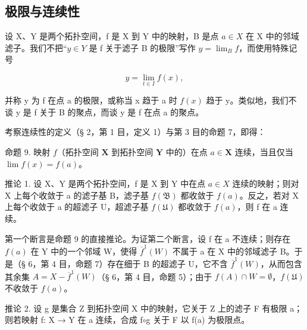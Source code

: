 \subsection{极限与连续性}

设 X、Y 是两个拓扑空间，f 是 X 到 Y 中的映射，B 是点 \(a \in X\) 在 X 中的邻域滤子。我们不把“\(y \in Y\) 是 f 关于滤子 B 的极限”写作 \(y = \lim_{B} f\)，而使用特殊记号

\[
y = \lim _ {t \in I} f (x),
\]

并称 y 为 f 在点 a 的极限，或称当 x 趋于 a 时 \(f(x)\) 趋于 y。类似地，我们不谈 y 是 f 关于 B 的聚点，而谈 y 是 f 在点 a 的聚点。

考察连续性的定义（§ 2，第 1 目，定义 1）与第 3 目的命题 7，即得：

命题 9. 映射 \(f\)（拓扑空间 \(\mathbf{X}\) 到拓扑空间 \(\mathbf{Y}\) 中的）在点 \(a \in \mathbf{X}\) 连续，当且仅当 \(\lim f(x) = f(a)\)。

推论 1. 设 X、Y 是两个拓扑空间，f 是 X 到 Y 中在点 \(a \in X\) 连续的映射；则对 X 上每个收敛于 a 的滤子基 B，滤子基 \(f(\mathfrak{B})\) 都收敛于 \(f(a)\)。反之，若对 X 上每个收敛于 a 的超滤子 U，超滤子基 \(f(\mathfrak{U})\) 都收敛于 \(f(a)\)，则 f 在 a 连续。

第一个断言是命题 9 的直接推论。为证第二个断言，设 f 在 a 不连续；则存在 \(f(a)\) 在 Y 中的一个邻域 W，使得 \(\overline{f}^{1}(W)\) 不属于 a 在 X 中的邻域滤子 B。于是（§ 6，第 4 目，命题 7）存在细于 B 的超滤子 U，它不含 \(\overline{f}^{1}(W)\)，从而包含其余集 \(A = X - \overline{f}^{1}(W)\)（§ 6，第 4 目，命题 5）；由于 \(f(A) \cap W = \emptyset\)，\(f(\mathfrak{U})\) 不收敛于 \(f(a)\)。

推论 2. 设 g 是集合 Z 到拓扑空间 X 中的映射，它关于 Z 上的滤子 F 有极限 a；则若映射 f: X → Y 在 a 连续，合成 f\(\circ\)g 关于 F 以 f(a) 为极限点。

